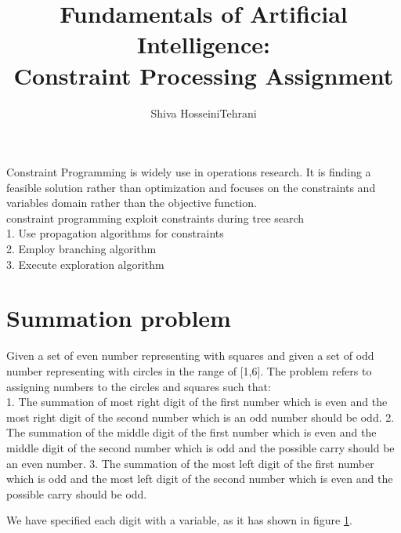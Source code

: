 \documentclass[]{article}
\begin{document}
\title{Fundamentals of Artificial Intelligence:\\Constraint Processing Assignment}
\author{Shiva HosseiniTehrani}
\maketitle

Constraint Programming is widely use in operations research. It is finding a feasible solution rather than optimization and focuses on the constraints and variables domain rather than the objective function.
\\
constraint programming exploit constraints during tree search\\
1. Use propagation algorithms for constraints\\
2. Employ branching algorithm\\
3. Execute exploration algorithm\\


\section{Summation problem}
Given a set of even number representing with squares and given a set of odd number representing with circles in the range of [1,6]. The problem refers to assigning numbers to the circles and squares such that:\\
1. The summation of most right digit of the first number which is even and the most right digit of the second number which is an odd number should be odd.
2. The summation of the middle digit of the first number which is even and the middle digit of the second number which is odd and the possible carry should be an even number.
3. The summation of the most left digit of the first number which is odd and the most left digit of the second number which is even and the possible carry should be odd.

We have specified each digit with a variable, as it has shown in figure \ref{fig:fig0}.
\\
\begin{figure}[h]
\centering
{}
\label{fig:fig0}
\end{figure}
 
\end{document}
